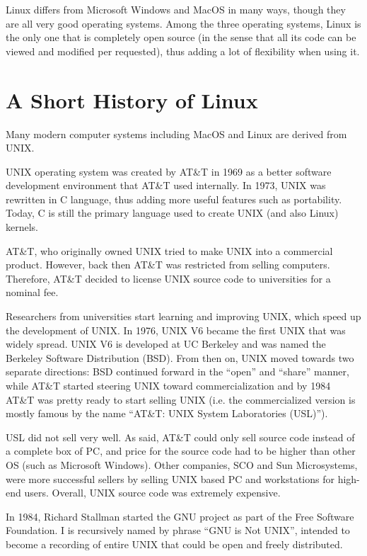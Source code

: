 Linux differs from Microsoft Windows and MacOS in many ways, though they are all very good operating systems. Among the three operating systems, Linux is the only one that is completely open source (in the sense that all its code can be viewed and modified per requested), thus adding a lot of flexibility when using it.

\section{A Short History of Linux}

Many modern computer systems including MacOS and Linux are derived from UNIX. 

UNIX operating system was created by AT\&T in 1969 as a better software development environment that AT\&T used internally. In 1973, UNIX was rewritten in C language, thus adding more useful features such as portability. Today, C is still the primary language used to create UNIX (and also Linux) kernels.

AT\&T, who originally owned UNIX tried to make UNIX into a commercial product. However, back then AT\&T was restricted from selling computers. Therefore, AT\&T decided to license UNIX source code to universities for a nominal fee. 

Researchers from universities start learning and improving UNIX, which speed up the development of UNIX. In 1976, UNIX V6 became the first UNIX that was widely spread. UNIX V6 is developed at UC Berkeley and was named the Berkeley Software Distribution (BSD). From then on, UNIX moved towards two separate directions: BSD continued forward in the ``open'' and ``share'' manner, while AT\&T started steering UNIX toward commercialization and by 1984 AT\&T was pretty ready to start selling UNIX (i.e. the commercialized version is mostly famous by the name ``AT\&T: UNIX System Laboratories (USL)'').

USL did not sell very well. As said, AT\&T could only sell source code instead of a complete box of PC, and price for the source code had to be higher than other OS (such as Microsoft Windows). Other companies, SCO and Sun Microsystems, were more successful sellers by selling UNIX based PC and workstations for high-end users. Overall, UNIX source code was extremely expensive.

In 1984, Richard Stallman started the GNU project as part of the Free Software Foundation. I is recursively named by phrase ``GNU is Not UNIX'', intended to become a recording of entire UNIX that could be open and freely distributed.







